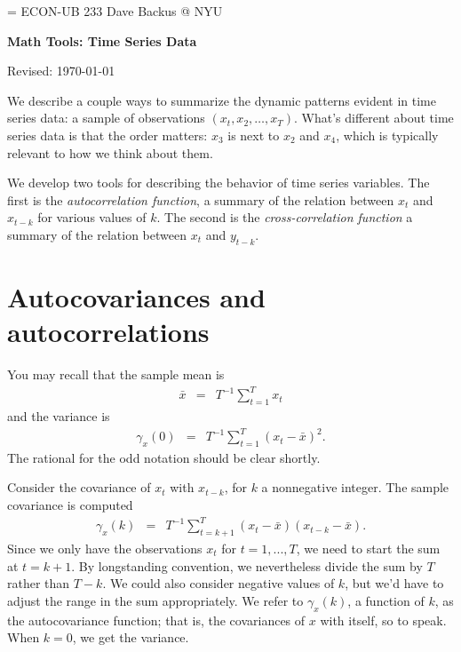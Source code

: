 \documentclass[11pt]{article}
\begin{document}
\parskip=\bigskipamount
\parindent=0.0in
\thispagestyle{empty}
{\large ECON-UB 233 \hfill Dave Backus @ NYU}

\bigskip\bigskip
\centerline{\Large \bf Math Tools:  Time Series Data}
\centerline{Revised: \today}

\bigskip
We describe a couple ways to summarize the dynamic patterns
evident in time series data:
a sample of observations
$ (x_t, x_2, \ldots, x_T)$.
What's different about time series data is that the order matters:
$x_3$ is next to $x_2$ and $x_4$,
which is typically relevant to how we think about them.

We develop two tools for describing the behavior of time series variables.
The first is the {\it autocorrelation function\/},
a summary of the relation between $x_t$ and $x_{t-k}$
for various values of $k$.
The second is the {\it cross-correlation function\/}
a summary of the relation between $x_t$ and $y_{t-k}$.


\begin{comment}
\subsection*{Stationarity}

We'll be talking about sample moments, but the sample moments only
make sense if we have some underlying distribution theory.
Distribution of $x_t$ doesn't depend on $t$.
For example, its mean and variance don't depend on $t$.
Ditto joint distribution $ (x_t, x_{t+1}, x_{t+k} ,...)$ ...

That means moments don't depend on $t$, including mean and variance.
\end{comment}

\section{Autocovariances and autocorrelations}

You may recall that the sample mean is
\begin{eqnarray*}
    \bar{x} &=& T^{-1} \sum_{t=1}^T x_{t}
\end{eqnarray*}
and the variance is
\begin{eqnarray*}
    \gamma_x(0)  &=&   T^{-1} \sum_{t=1}^T (x_{t}-\bar{x})^2 .
\end{eqnarray*}
The rational for the odd notation should be clear shortly.


Consider the covariance of $x_t$ with $x_{t-k}$,
for $k$ a nonnegative integer.
The sample covariance is computed
\begin{eqnarray*}
    \gamma_x(k)  &=&  T^{-1} \sum_{t=k+1}^T (x_{t}-\bar{x})(x_{t-k}-\bar{x}) .
\end{eqnarray*}
Since we only have the observations $x_t$ for $t=1,...,T$,
we need to start the sum at $t=k+1$.
By longstanding convention, we nevertheless divide the sum by $T$ rather than $T-k$.
We could also consider negative values of $k$, but we'd have to adjust the
range in the sum appropriately.
We refer to $\gamma_x(k)$, a function of $k$, as the autocovariance function;
that is, the covariances of $x$ with itself, so to speak.
When $k=0$, we get the variance.
\end{document}
